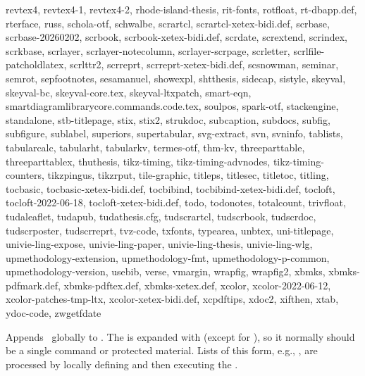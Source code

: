 \documentclass{l3in2edoc}
\begin{document}
{  revtex4, revtex4-1, revtex4-2, rhode-island-thesis, rit-fonts,
  rotfloat, rt-dbapp.def, rterface, russ, schola-otf, schwalbe,
  scrartcl, scrartcl-xetex-bidi.def, scrbase, scrbase-20260202, scrbook,
  scrbook-xetex-bidi.def, scrdate, scrextend, scrindex, scrkbase,
  scrlayer, scrlayer-notecolumn, scrlayer-scrpage, scrletter,
  scrlfile-patcholdlatex, scrlttr2, scrreprt, scrreprt-xetex-bidi.def,
  scsnowman, seminar, semrot, sepfootnotes, sesamanuel, showexpl,
  shtthesis, sidecap, sistyle, skeyval, skeyval-bc, skeyval-core.tex,
  skeyval-ltxpatch, smart-eqn,
  smartdiagramlibrarycore.commands.code.tex, soulpos, spark-otf,
  stackengine, standalone, stb-titlepage, stix, stix2, strukdoc,
  subcaption, subdocs, subfig, subfigure, sublabel, superiors,
  supertabular, svg-extract, svn, svninfo, tablists, tabularcalc,
  tabularht, tabularkv, termes-otf, thm-kv, threeparttable,
  threeparttablex, thuthesis, tikz-timing, tikz-timing-advnodes,
  tikz-timing-counters, tikzpingus, tikzrput, tile-graphic, titleps,
  titlesec, titletoc, titling, tocbasic, tocbasic-xetex-bidi.def,
  tocbibind, tocbibind-xetex-bidi.def, tocloft, tocloft-2022-06-18,
  tocloft-xetex-bidi.def, todo, todonotes, totalcount, trivfloat,
  tudaleaflet, tudapub, tudathesis.cfg, tudscrartcl, tudscrbook,
  tudscrdoc, tudscrposter, tudscrreprt, tvz-code, txfonts, typearea,
  unbtex, uni-titlepage, univie-ling-expose, univie-ling-paper,
  univie-ling-thesis, univie-ling-wlg, upmethodology-extension,
  upmethodology-fmt, upmethodology-p-common, upmethodology-version,
  usebib, verse, vmargin, wrapfig, wrapfig2, xbmks, xbmks-pdfmark.def,
  xbmks-pdftex.def, xbmks-xetex.def, xcolor, xcolor-2022-06-12,
  xcolor-patches-tmp-ltx, xcolor-xetex-bidi.def, xcpdftips, xdoc2,
  xifthen, xtab, ydoc-code, zwgetfdate}


\begin{function}[]
  {
    \@cons
  }
  \begin{syntax}
      
  \end{syntax}
  Appends \, globally to . The
   is expanded with  (except for ), so
  it normally should be a single command or protected material. Lists
  of this form, e.g., , are processed by locally
  defining  and then executing the .

\end{function}
\end{document}
